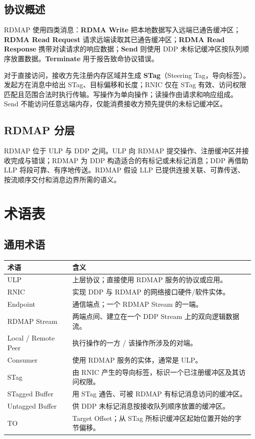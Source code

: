 \documentclass[11pt,a4paper]{article}
\newcommand{\term}[1]{\textbf{#1}}
\begin{document}
\subsection{协议概述}
RDMAP 使用四类消息：\term{RDMA Write} 把本地数据写入远端已通告缓冲区；\term{RDMA Read Request} 请求远端读取其已通告缓冲区；\term{RDMA Read Response} 携带对读请求的响应数据；\term{Send} 则使用 DDP 未标记缓冲区按队列顺序放置数据。\term{Terminate} 用于报告致命协议错误。

对于直接访问，接收方先注册内存区域并生成 \term{STag}（Steering Tag，导向标签）。发起方在消息中给出 STag、目标偏移和长度；RNIC 仅在 STag 有效、访问权限匹配且范围合法时执行传输。写操作为单向操作；读操作由请求和响应组成。Send 不能访问任意远端内存，仅能消费接收方预先提供的未标记缓冲区。
\subsection{RDMAP 分层}
RDMAP 位于 ULP 与 DDP 之间。ULP 向 RDMAP 提交操作、注册缓冲区并接收完成与错误；RDMAP 为 DDP 构造适合的有标记或未标记消息；DDP 再借助 LLP 将段可靠、有序地传送。RDMAP 假设 LLP 已提供连接关联、可靠传送、按流顺序交付和消息边界所需的语义。
\section{术语表}
\subsection{通用术语}
\begin{longtable}{p{.25\linewidth}p{.67\linewidth}}
\toprule 术语 & 含义\\\midrule\endhead
ULP & 上层协议；直接使用 RDMAP 服务的协议或应用。\\
RNIC & 实现 DDP 与 RDMAP 的网络接口硬件/软件实体。\\
Endpoint & 通信端点；一个 RDMAP Stream 的一端。\\
RDMAP Stream & 两端点间、建立在一个 DDP Stream 上的双向逻辑数据流。\\
Local / Remote Peer & 执行操作的一方 / 该操作所涉及的对端。\\
Consumer & 使用 RDMAP 服务的实体，通常是 ULP。\\
STag & 由 RNIC 产生的导向标签，标识一个已注册缓冲区及其访问权限。\\
STagged Buffer & 用 STag 通告、可被 RDMAP 有标记消息访问的缓冲区。\\
Untagged Buffer & 供 DDP 未标记消息按接收队列顺序放置的缓冲区。\\
TO & Target Offset；从 STag 所标识缓冲区起始位置开始的字节偏移。\\
\bottomrule
\end{longtable}
\end{document}
